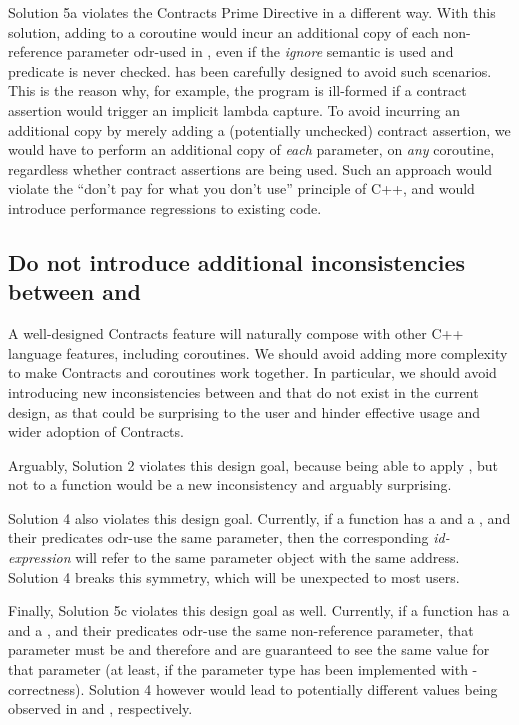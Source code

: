 Solution 5a violates the Contracts Prime Directive in a different way. With this solution, adding  to a coroutine would incur an additional copy of each non-reference parameter odr-used in , even if the \emph{ignore} semantic is used and predicate is never checked. \cite{P2900R8} has been carefully designed to avoid such scenarios. This is the reason why, for example, the program is ill-formed if a contract assertion would trigger an implicit lambda capture. To avoid incurring an additional copy by merely adding a (potentially unchecked) contract assertion, we would have to perform an additional copy of \emph{each} parameter, on \emph{any} coroutine, regardless whether contract assertions are being used. Such an approach would  violate the ``don't pay for what you don't use'' principle of C++, and would introduce performance regressions to existing code.

\subsection{Do not introduce additional inconsistencies between  and }

A well-designed Contracts feature will naturally compose with other C++ language features, including coroutines. We should avoid adding more complexity to make Contracts and coroutines work together. In particular, we should avoid introducing new inconsistencies between  and  that do not exist in the current design, as that could be surprising to the user and hinder effective usage and wider adoption of Contracts.

Arguably, Solution 2 violates this design goal, because being able to apply , but not  to a function would be a new inconsistency and arguably surprising.

Solution 4 also violates this design goal. Currently, if a function has a  and a , and their predicates odr-use the same parameter, then the corresponding \emph{id-expression} will refer to the same parameter object with the same address. Solution 4 breaks this symmetry, which will be unexpected to most users.

Finally, Solution 5c violates this design goal as well. Currently, if a function has a  and a , and their predicates odr-use the same non-reference parameter, that parameter must be  and therefore  and  are guaranteed to see the same value for that parameter (at least, if the parameter type has been implemented with -correctness). Solution 4 however would lead to potentially different values being observed in  and , respectively.

